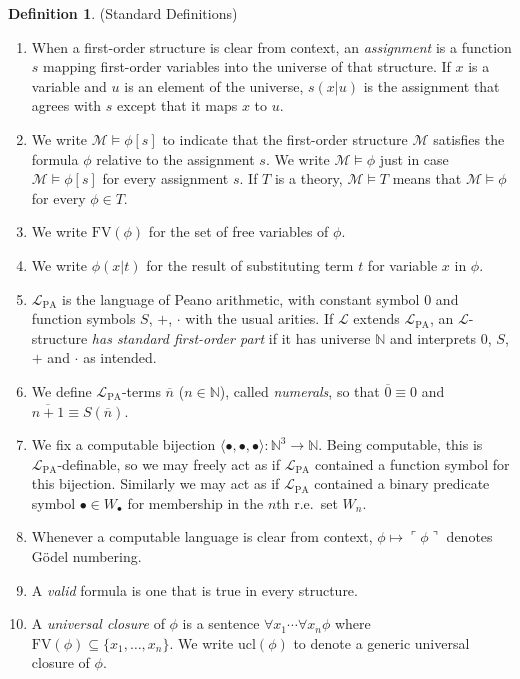 \documentclass[reqno]{article}
\theoremstyle{definition}
\newtheorem{definition}[theorem]{Definition}
\def\N{\mathbb{N}}
\def\L{\mathscr{L}}
\def\M{\mathscr{M}}
\def\FV{\mathrm{FV}}
\def\LPA{\L_{\mathrm{PA}}}
\newcommand{\ucl}[1]{\mathrm{ucl}(#1)}
\begin{document}
\begin{definition}
\label{stddefn}
(Standard Definitions)
\begin{enumerate}
\item When a first-order structure is clear from context, an \emph{assignment} is a 
function $s$ mapping first-order variables into the universe of that structure.  If 
$x$ is a variable and $u$ is an element of the universe, $s(x|u)$ is the 
assignment that agrees with $s$ except that it maps $x$ to $u$.
\item We write $\M\models\phi[s]$ to indicate that the first-order structure $\M$ 
satisfies the formula $\phi$ relative to the assignment $s$.  We write 
$\M\models \phi$ just in case $\M\models\phi[s]$ for every assignment $s$.
If $T$ is a theory, $\M\models T$ means that $\M\models\phi$ for every 
$\phi\in T$.
\item We write $\FV(\phi)$ for the set of free variables of $\phi$.
\item We write $\phi(x|t)$ for the result of substituting term $t$ for 
variable $x$ in $\phi$.
\item $\LPA$ is the language of Peano arithmetic, with constant 
symbol $0$ and function symbols $S$, $+$, $\cdot$ with the usual arities.
If $\L$ extends $\LPA$, an $\L$-structure \emph{has standard 
first-order part} if it has universe $\N$ and interprets $0$, $S$, $+$ and 
$\cdot$ as intended.
\item We define $\LPA$-terms $\overline n$ ($n\in\N$), called 
\emph{numerals}, so that $\overline 0 \equiv 0$ and $\overline{n+1}\equiv S(\overline 
n)$.
\item We fix a computable bijection 
$\langle 
\bullet,\bullet,\bullet\rangle:\N^3\to\N$.
Being computable, this is $\LPA$-definable, so we may freely 
act as if $\LPA$ contained a function symbol for this bijection. 
Similarly we may act as if $\LPA$ contained a binary predicate symbol $\bullet\in 
W_\bullet$ for membership in the $n$th r.e.~set $W_n$.
\item Whenever a computable language is clear from context, 
$\phi\mapsto\ulcorner\phi\urcorner$ denotes G\"odel numbering.
\item A \emph{valid} formula is one that is true in every structure.
\item A \emph{universal closure} of $\phi$ is a sentence $\forall 
x_1\cdots \forall x_n\phi$ where $\FV(\phi)\subseteq\{x_1,\ldots,x_n\}$.
We write $\ucl{\phi}$ to denote a generic universal closure of $\phi$.
\end{enumerate}
\end{definition}
\end{document}
